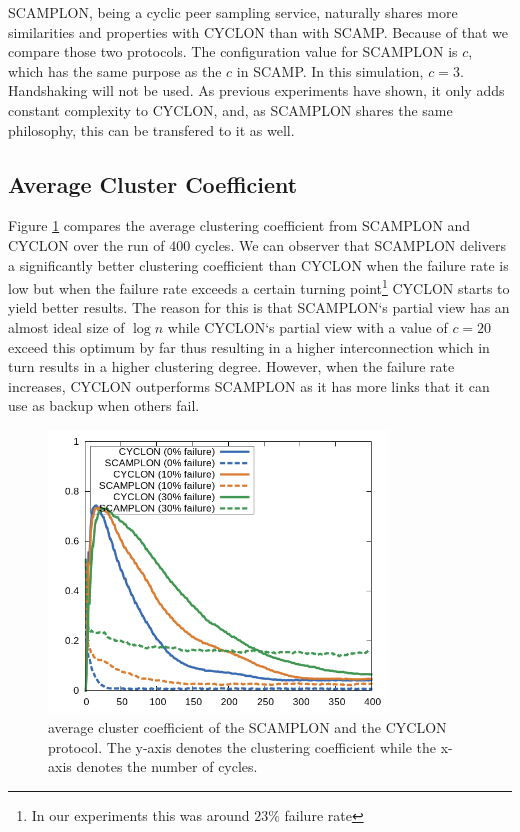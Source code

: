 \documentclass[11pt, english, screen]{report-rd-info}
\begin{document}
SCAMPLON, being a cyclic peer sampling service, naturally shares more similarities and properties with CYCLON than with SCAMP.
Because of that we compare those two protocols. 
The configuration value for SCAMPLON is $c$, which has the same purpose as the $c$ in SCAMP. In this simulation, $c = 3$.
Handshaking will not be used.
As previous experiments have shown, it only adds constant complexity to CYCLON, and, as SCAMPLON shares the same philosophy, this can be transfered to it as well.

\subsection{Average Cluster Coefficient}

Figure \ref{fig:n1} compares the average clustering coefficient from SCAMPLON and CYCLON over the run of $400$ cycles.
We can observer that SCAMPLON delivers a significantly better clustering coefficient than CYCLON when the failure rate is low but when the failure rate exceeds a certain turning point\footnote{In our experiments this was around $23\%$ failure rate} CYCLON starts to yield better results.
The reason for this is that SCAMPLON`s partial view has an almost ideal size of $\log{n}$ while CYCLON`s partial view with a value of $c=20$ exceed this optimum by far thus resulting in a higher interconnection which in turn results in a higher clustering degree.
However, when the failure rate increases, CYCLON outperforms SCAMPLON as it has more links that it can use as backup when others fail.


\begin{figure}[H]
    \centering
    \includegraphics[width=9cm]{Images/statistics/scamplon_1000_c3/cluster/all}
    \caption{average cluster coefficient of the SCAMPLON and the CYCLON protocol. The y-axis denotes the clustering coefficient while the x-axis denotes the number of cycles.}
    \label{fig:n1}
\end{figure}
\end{document}
